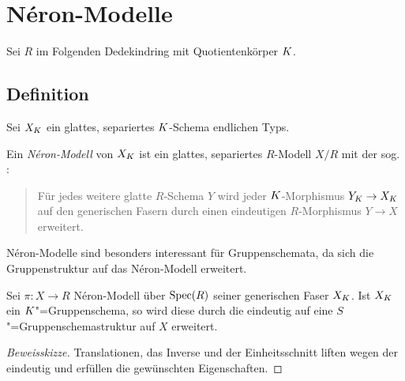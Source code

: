 \documentclass[german]{scrreprt}
\begin{document}


\chapter{Néron-Modelle}
Sei $R$ im Folgenden Dedekindring mit Quotientenkörper $K$.
\section{Definition}
\begin{Definition}
  Sei $X_{K}$ ein glattes, separiertes $K$-Schema endlichen Typs.

  Ein \emph{Néron-Modell} von $X_{K}$ ist ein glattes, separiertes
  $R$-Modell $X/R$ %
  mit der sog. \emph{\NAbbEig}:
  \begin{quote}
    Für jedes weitere glatte $R$-Schema $Y$ wird jeder
    $K$-Morphismus $Y_{K}\to X_{K}$ auf den generischen Fasern durch
    einen eindeutigen $R$-Morphismus $Y\to X$ erweitert.
  \end{quote}
\end{Definition}

Néron-Modelle sind besonders interessant für Gruppenschemata, da sich
die Gruppenstruktur auf das Néron-Modell erweitert.
\begin{Bemerkung}\label{thm:gruppenschemaerweiterung}
  Sei $\pi\colon X\to R$ Néron-Modell über $\operatorname{Spec}(R)$ seiner
  generischen Faser $X_{K}$. Ist $X_{K}$ ein $K$"=Gruppenschema, so
  wird diese durch die \NAbbEig eindeutig auf eine
  $S$"=Gruppenschemastruktur auf $X$ erweitert.
  \begin{proof}[Beweisskizze]
    Translationen, das Inverse und der Einheitsschnitt liften wegen
    der \NAbbEig eindeutig und erfüllen die gewünschten Eigenschaften.
  \end{proof}
\end{Bemerkung}
\end{document}
